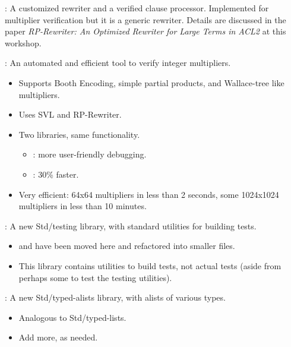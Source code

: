 
\begin{frame}

\newlibtitle

:
A customized rewriter and a verified
clause processor. Implemented for multiplier verification but it is a
generic rewriter. Details are discussed in the paper {\it RP-Rewriter: An
Optimized Rewriter for Large Terms in ACL2} at this workshop.

\separation

:
An automated and efficient tool to verify integer multipliers.
\begin{itemize}
\item
Supports Booth Encoding,
simple partial products,
and Wallace-tree like multipliers.
\item Uses SVL and RP-Rewriter.
\item Two libraries, same  functionality.
  \begin{itemize}
  \item {}: more  user-friendly debugging.
  \item{}: 30\% faster.
  \end{itemize}
\item  Very efficient:  64x64  multipliers  in less  than  2 seconds,  some
  1024x1024 multipliers in less than 10 minutes.
\end{itemize}

\end{frame}


\begin{frame}

\newlibtitle

:
A new Std/testing library, with standard utilities for building tests.
\begin{itemize}
\item
{} and 
have been moved here and refactored into smaller files.
\item
This library contains utilities to build tests,
not actual tests (aside from perhaps some to test the testing utilities).
\end{itemize}

\separation

:
A new Std/typed-alists library, with alists of various types.
\begin{itemize}
\item
Analogous to Std/typed-lists.
\item
Add more, as needed.
\end{itemize}

\end{frame}

